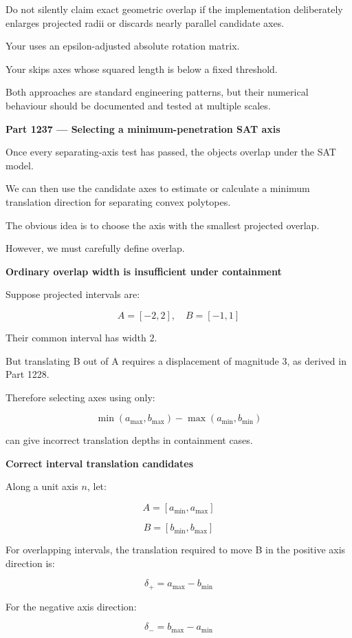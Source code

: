 Do not silently claim exact geometric overlap if the implementation deliberately enlarges projected radii or discards nearly parallel candidate axes.

Your  uses an epsilon-adjusted absolute rotation matrix.

Your  skips axes whose squared length is below a fixed threshold.

Both approaches are standard engineering patterns, but their numerical behaviour should be documented and tested at multiple scales.

\textbf{Part 1237 --- Selecting a minimum-penetration SAT axis}

Once every separating-axis test has passed, the objects overlap under the SAT model.

We can then use the candidate axes to estimate or calculate a minimum translation direction for separating convex polytopes.

The obvious idea is to choose the axis with the smallest projected overlap.

However, we must carefully define overlap.

\textbf{Ordinary overlap width is insufficient under containment}

Suppose projected intervals are:

\[
A=[-2,2],\quad B=[-1,1]
\]

Their common interval has width \(2\).

But translating B out of A requires a displacement of magnitude \(3\), as derived in Part 1228.

Therefore selecting axes using only:

\[
\min(a_{\max},b_{\max})- \max(a_{\min},b_{\min})
\]

can give incorrect translation depths in containment cases.

\textbf{Correct interval translation candidates}

Along a unit axis \(n\), let:

\[
A=[a_{\min},a_{\max}]
\]

\[
B=[b_{\min},b_{\max}]
\]

For overlapping intervals, the translation required to move B in the positive axis direction is:

\[
\boxed{ \delta_+=a_{\max}-b_{\min} }
\]

For the negative axis direction:

\[
\boxed{ \delta_-=b_{\max}-a_{\min} }
\]

